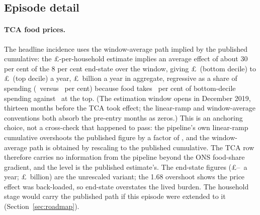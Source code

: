 

\subsection{Episode detail}

\paragraph{TCA food prices.} The headline incidence uses the
window-average path implied by the published cumulative: the
\pounds\MsTcaPublishedCumulGbp-per-household estimate implies an
average effect of about 30 per cent of the 8 per cent end-state over
the window, giving \pounds\MsTcaWindowAvgGbpDecOne\
(bottom decile) to \pounds\MsTcaWindowAvgGbpDecTen\ (top decile) a
year, \pounds\MsTcaWindowAvgAggBn\ billion a year in aggregate, regressive as a share of spending
(\MsTcaWindowAvgPctSpendDecOne\ versus
\MsTcaWindowAvgPctSpendDecTen\ per cent) because food takes
\MsTcaBudgetSharePctDecOne\ per cent of bottom-decile spending
against \MsTcaBudgetSharePctDecTen\ at the top. (The estimation window opens in December 2019, thirteen months before
the TCA took effect; the linear-ramp and window-average conventions
both absorb the pre-entry months as zeros.) This is an anchoring
choice, not a cross-check that happened to pass: the pipeline's own linear-ramp
cumulative overshoots the published figure by a factor of
\MsTcaCrossCheckRatio, and the window-average path is obtained by
rescaling to the published cumulative. The TCA row therefore carries no
information from the pipeline beyond the ONS food-share gradient, and
the level is the published estimate's. The end-state figures
(\pounds\MsTcaAnnGbpDecOne--\MsTcaAnnGbpDecTen\ a year;
\pounds\MsTcaAggBnPerYear\ billion) are the unrescaled variant; the
1.68 overshoot shows the price effect was back-loaded, so end-state
overstates the lived burden. The
household stage would carry the published path if this episode were
extended to it (Section~\ref{sec:roadmap}).


